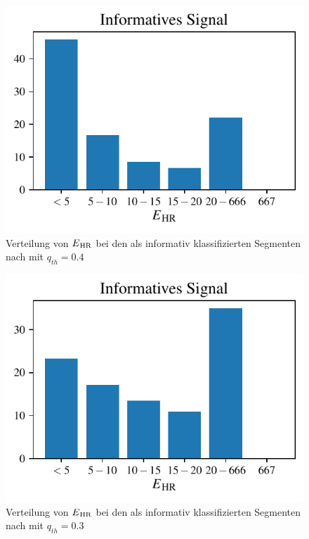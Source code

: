 \begin{figure}[H]
 	\centering
 	\includegraphics{pic/brueser04-positives.pdf}
 	\caption[Verteilung von $E\textsubscript{HR}$ bei den als informativ klassifizierten Segmenten nach mit $q_{th}=0.4$]{Verteilung von $E\textsubscript{HR}$ bei den als informativ klassifizierten Segmenten nach mit $q_{th}=0.4$}
 	\label{fig:brueser04-positives}
 \end{figure}
 
  \begin{figure}[H]
 	\centering
 	\includegraphics{pic/brueser03-positives.pdf}
 	\caption[Verteilung von $E\textsubscript{HR}$ bei den als informativ klassifizierten Segmenten nach mit $q_{th}=0.3$]{Verteilung von $E\textsubscript{HR}$ bei den als informativ klassifizierten Segmenten nach mit $q_{th}=0.3$}
 	\label{fig:brueser03-positives}
 \end{figure}


